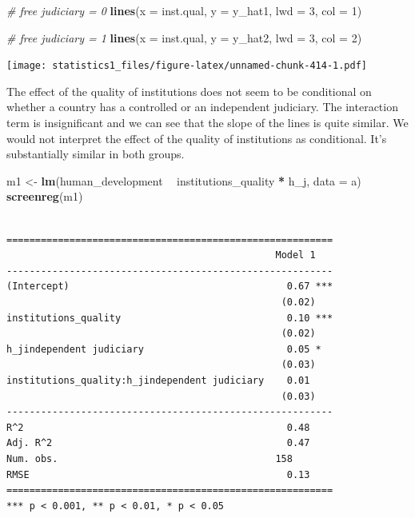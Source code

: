 \documentclass[]{article}
\newenvironment{Shaded}{\begin{snugshade}}{\end{snugshade}}
\newcommand{\KeywordTok}[1]{\textcolor[rgb]{0.13,0.29,0.53}{\textbf{#1}}}
\newcommand{\DataTypeTok}[1]{\textcolor[rgb]{0.13,0.29,0.53}{#1}}
\newcommand{\DecValTok}[1]{\textcolor[rgb]{0.00,0.00,0.81}{#1}}
\newcommand{\StringTok}[1]{\textcolor[rgb]{0.31,0.60,0.02}{#1}}
\newcommand{\CommentTok}[1]{\textcolor[rgb]{0.56,0.35,0.01}{\textit{#1}}}
\newcommand{\OperatorTok}[1]{\textcolor[rgb]{0.81,0.36,0.00}{\textbf{#1}}}
\newcommand{\NormalTok}[1]{#1}
\theoremstyle{definition}
\theoremstyle{definition}
\theoremstyle{definition}
\theoremstyle{remark}
\begin{document}
\begin{Shaded}
\begin{Highlighting}[]
\CommentTok{# free judiciary = 0 }
\KeywordTok{lines}\NormalTok{(}\DataTypeTok{x =}\NormalTok{ inst.qual, }\DataTypeTok{y =}\NormalTok{ y_hat1, }\DataTypeTok{lwd =} \DecValTok{3}\NormalTok{, }\DataTypeTok{col =} \DecValTok{1}\NormalTok{)}

\CommentTok{# free judiciary = 1 }
\KeywordTok{lines}\NormalTok{(}\DataTypeTok{x =}\NormalTok{ inst.qual, }\DataTypeTok{y =}\NormalTok{ y_hat2, }\DataTypeTok{lwd =} \DecValTok{3}\NormalTok{, }\DataTypeTok{col =} \DecValTok{2}\NormalTok{)}
\end{Highlighting}
\end{Shaded}

\texttt{[image: statistics1\_files/figure-latex/unnamed-chunk-414-1.pdf]}

The effect of the quality of institutions does not seem to be
conditional on whether a country has a controlled or an independent
judiciary. The interaction term is insignificant and we can see that the
slope of the lines is quite similar. We would not interpret the effect
of the quality of institutions as conditional. It's substantially
similar in both groups.

\begin{Shaded}
\begin{Highlighting}[]
\NormalTok{m1 <-}\StringTok{ }\KeywordTok{lm}\NormalTok{(human_development }\OperatorTok{~}\StringTok{ }\NormalTok{institutions_quality }\OperatorTok{*}\StringTok{ }\NormalTok{h_j, }\DataTypeTok{data =}\NormalTok{ a)}
\KeywordTok{screenreg}\NormalTok{(m1)}
\end{Highlighting}
\end{Shaded}

\begin{verbatim}

=========================================================
                                               Model 1   
---------------------------------------------------------
(Intercept)                                      0.67 ***
                                                (0.02)   
institutions_quality                             0.10 ***
                                                (0.02)   
h_jindependent judiciary                         0.05 *  
                                                (0.03)   
institutions_quality:h_jindependent judiciary    0.01    
                                                (0.03)   
---------------------------------------------------------
R^2                                              0.48    
Adj. R^2                                         0.47    
Num. obs.                                      158       
RMSE                                             0.13    
=========================================================
*** p < 0.001, ** p < 0.01, * p < 0.05
\end{verbatim}
\end{document}

